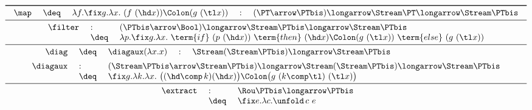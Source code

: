 \begin{table}[t!]
\[
\begin{array}{c}
\toprule

\begin{array}{r !{~}c!{~} l !{~}c!{~} l}
  \bm{\map}
& \deq
& \lambda f. \fix g. \lambda x.~
  (f\ (\hd x)) \Colon (g\ (\tl x))

& :
& (\PT \arrow \PTbis)
  \longarrow
  \Stream\PT
  \longarrow
  \Stream\PTbis

\end{array}


\\\midrule

\begin{array}{r !{~}l!{~} l}
  \bm{\filter}
& :
& (\PTbis \arrow \Bool)
  \longarrow
  \Stream\PTbis
  \longarrow
  \Stream\PTbis
\\


& \deq
& \lambda p. \fix g.\lambda x.~
  \term{if}~ (p\ (\hd x))
  ~\term{then}~ (\hd x) \Colon (g\ (\tl x))
  ~\term{else}~ (g\ (\tl x))
\end{array}


\\\midrule

\begin{array}{r !{~}l!{~} l !{~}c!{~} l}
  \bm{\diag}
& \deq
& \diagaux (\lambda x.x)
& :
& \Stream(\Stream \PTbis) \longarrow \Stream \PTbis
\\[0.5em]

  \bm{\diagaux}
& :
& \multicolumn{3}{l}{
  (\Stream\PTbis \arrow \Stream\PTbis)
  \longarrow
  \Stream (\Stream \PTbis)
  \longarrow
  \Stream \PTbis
  }
\\

& \deq
& \multicolumn{3}{l}{
  \fix g. \lambda k. \lambda x.~
  \big( (\hd \comp\, k) (\hd x) \big)
  \Colon
  \big( g\ (k \comp \tl)\ (\tl x) \big)
  }
\end{array}

\\\midrule

\begin{array}{c !{\qquad} c}

\begin{array}[t]{l !{~}l!{~} l}

  \bm{\extract}
& :
& \Rou \PTbis \longarrow \PTbis
\\
& \deq 
& \fix e.\lambda c. \unfold\, c\ e
\end{array}


\end{array}
\end{array}\]
\end{table}
